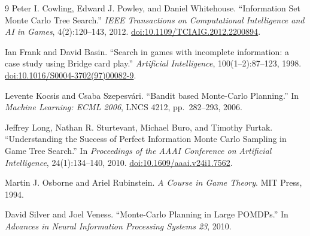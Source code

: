 \documentclass[11pt,a4paper]{article}
\theoremstyle{plain}
\theoremstyle{definition}
\begin{document}
\begin{thebibliography}{9}
Peter I. Cowling, Edward J. Powley, and Daniel Whitehouse.
``Information Set Monte Carlo Tree Search.''
\emph{IEEE Transactions on Computational Intelligence and AI in Games},
4(2):120--143, 2012.
\href{https://doi.org/10.1109/TCIAIG.2012.2200894}{doi:10.1109/TCIAIG.2012.2200894}.

Ian Frank and David Basin.
``Search in games with incomplete information: a case study using Bridge card play.''
\emph{Artificial Intelligence}, 100(1--2):87--123, 1998.
\href{https://doi.org/10.1016/S0004-3702(97)00082-9}{doi:10.1016/S0004-3702(97)00082-9}.

Levente Kocsis and Csaba Szepesv\'ari.
``Bandit based Monte-Carlo Planning.''
In \emph{Machine Learning: ECML 2006}, LNCS 4212, pp.~282--293, 2006.

Jeffrey Long, Nathan R. Sturtevant, Michael Buro, and Timothy Furtak.
``Understanding the Success of Perfect Information Monte Carlo Sampling in
Game Tree Search.'' In \emph{Proceedings of the AAAI Conference on Artificial
Intelligence}, 24(1):134--140, 2010.
\href{https://doi.org/10.1609/aaai.v24i1.7562}{doi:10.1609/aaai.v24i1.7562}.

Martin J. Osborne and Ariel Rubinstein.
\emph{A Course in Game Theory}. MIT Press, 1994.

David Silver and Joel Veness.
``Monte-Carlo Planning in Large POMDPs.''
In \emph{Advances in Neural Information Processing Systems 23}, 2010.
\end{thebibliography}
\end{document}
